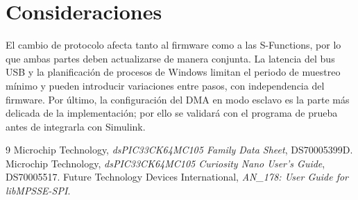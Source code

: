 \documentclass[11pt]{article}
\begin{document}
\section{Consideraciones}

El cambio de protocolo afecta tanto al firmware como a las S-Functions, por lo
que ambas partes deben actualizarse de manera conjunta. La latencia del bus USB
y la planificación de procesos de Windows limitan el periodo de muestreo mínimo
y pueden introducir variaciones entre pasos, con independencia del firmware.
Por último, la configuración del DMA en modo esclavo es la parte más delicada
de la implementación; por ello se validará con el programa de prueba antes de
integrarla con Simulink.

\begin{thebibliography}{9}
 Microchip Technology, \emph{dsPIC33CK64MC105 Family Data Sheet},
  DS70005399D.
 Microchip Technology, \emph{dsPIC33CK64MC105 Curiosity Nano
  User's Guide}, DS70005517.
 Future Technology Devices International, \emph{AN\_178: User
  Guide for libMPSSE-SPI}.
\end{thebibliography}
\end{document}
